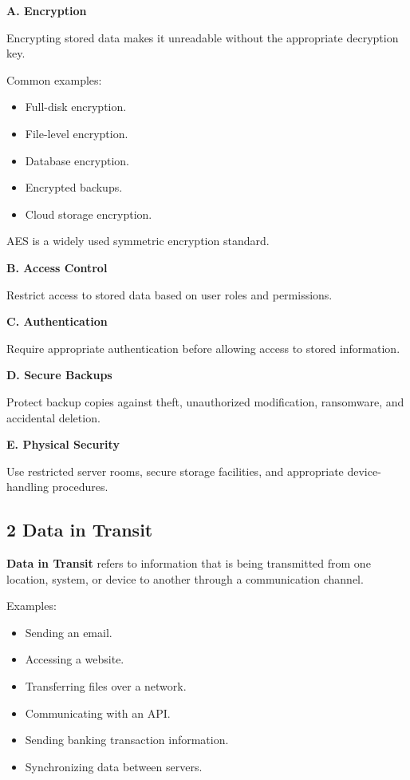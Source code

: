 \textbf{A. Encryption}

Encrypting stored data makes it unreadable without the appropriate decryption key.

Common examples:

\begin{itemize}
\item Full-disk encryption.
\item File-level encryption.
\item Database encryption.
\item Encrypted backups.
\item Cloud storage encryption.
\end{itemize}

AES is a widely used symmetric encryption standard.

\textbf{B. Access Control}

Restrict access to stored data based on user roles and permissions.

\textbf{C. Authentication}

Require appropriate authentication before allowing access to stored information.

\textbf{D. Secure Backups}

Protect backup copies against theft, unauthorized modification, ransomware, and accidental deletion.

\textbf{E. Physical Security}

Use restricted server rooms, secure storage facilities, and appropriate device-handling procedures.

\subsection{2 Data in Transit}

\textbf{Data in Transit} refers to information that is being transmitted from one location, system, or device to another through a communication channel.

Examples:

\begin{itemize}
\item Sending an email.
\item Accessing a website.
\item Transferring files over a network.
\item Communicating with an API.
\item Sending banking transaction information.
\item Synchronizing data between servers.
\end{itemize}


